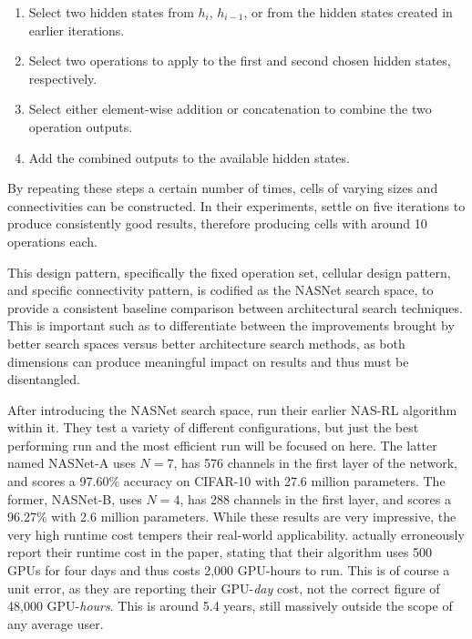 \begin{enumerate}[itemsep=-2mm]
    \item Select two hidden states from $h_i$, $h_{i-1}$, or from the hidden states created in earlier iterations.
    \item Select two operations to apply to the first and second chosen hidden states, respectively.
    \item Select either element-wise addition or concatenation to combine the two operation outputs.
    \item Add the combined outputs to the available hidden states.
\end{enumerate}

\noindent By repeating these steps a certain number of times, cells of varying sizes and connectivities can be constructed.
In their experiments, \citeauthor{zoph_sir2017} settle on five iterations to produce consistently good results, therefore producing cells
with around 10 operations each.

This design pattern, specifically the fixed operation set, cellular design pattern, and specific connectivity pattern, is
codified as the NASNet search space, to provide a consistent baseline comparison between architectural search techniques.
This is important such as to differentiate between the improvements brought by better search spaces versus better
architecture search methods, as both dimensions can produce meaningful impact on results and thus must be disentangled.

After introducing the NASNet search space, \citeauthor{zoph_sir2017} run their earlier NAS-RL algorithm within it. They test a variety
of different configurations, but just the best performing run and the most efficient run will be focused on here. The latter
named NASNet-A uses $N=7$, has 576 channels in the first layer of the network, and scores a 97.60\% accuracy on CIFAR-10
with 27.6 million parameters. The former, NASNet-B, uses $N=4$, has 288 channels in the first layer, and scores a 96.27\%
with 2.6 million parameters. While these results are very impressive, the very high runtime cost tempers their real-world
applicability. \citeauthor{zoph_sir2017} actually erroneously report their runtime cost in the paper, stating that their algorithm uses
500 GPUs for four days and thus costs 2,000 GPU-hours to run. This is of course a unit error, as they are reporting their
GPU-\textit{day} cost, not the correct figure of 48,000 GPU-\textit{hours}. This is around 5.4 years, still massively outside the scope
of any average user.

